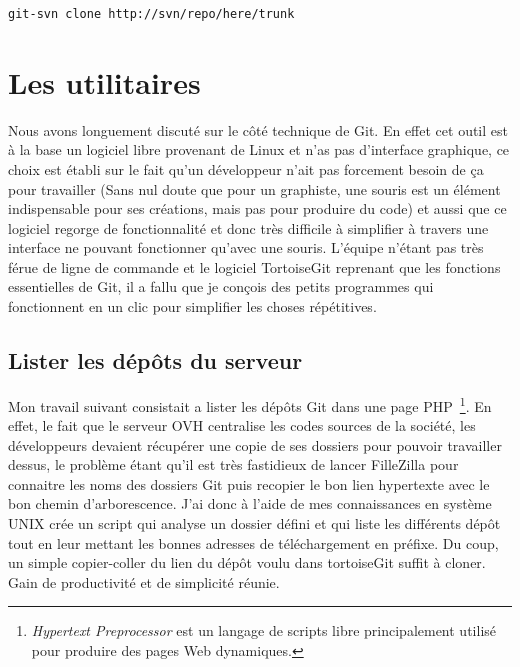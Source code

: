 \begin{lstlisting}
git-svn clone http://svn/repo/here/trunk
\end{lstlisting}

\section{Les utilitaires} %

Nous avons longuement discuté sur le côté technique de Git. En effet cet outil
est à la base un logiciel libre provenant de Linux et n'as pas d'interface
graphique, ce choix est établi sur le fait qu'un développeur n'ait pas
forcement besoin de ça pour travailler (Sans nul doute que pour un graphiste,
une souris est un élément indispensable pour ses créations, mais pas pour
produire du code) et aussi que ce logiciel regorge de fonctionnalité et donc
très difficile à simplifier à travers une interface ne pouvant fonctionner
qu'avec une souris. L'équipe n'étant pas très férue de ligne de commande et le
logiciel TortoiseGit reprenant que les fonctions essentielles de Git, il a
fallu que je conçois des petits programmes qui fonctionnent en un clic pour
simplifier les choses répétitives.


\subsection{Lister les dépôts du serveur}

Mon travail suivant consistait a lister les dépôts Git dans une page PHP\,
\footnote{\emph{Hypertext Preprocessor} est un langage de scripts libre
principalement utilisé pour produire des pages Web dynamiques.}. En effet, le
fait que le serveur OVH centralise les codes sources de la société, les
développeurs devaient récupérer une copie de ses dossiers pour pouvoir
travailler dessus, le problème étant qu'il est très fastidieux de lancer
FilleZilla pour connaitre les noms des dossiers Git puis recopier le bon lien
hypertexte avec le bon chemin d'arborescence. J'ai donc à l'aide de mes
connaissances en système UNIX crée un script qui analyse un dossier défini et
qui liste les différents dépôt tout en leur mettant les bonnes adresses de
téléchargement en préfixe. Du coup, un simple copier-coller du lien du dépôt
voulu dans tortoiseGit suffit à cloner. Gain de productivité et de simplicité
réunie.

